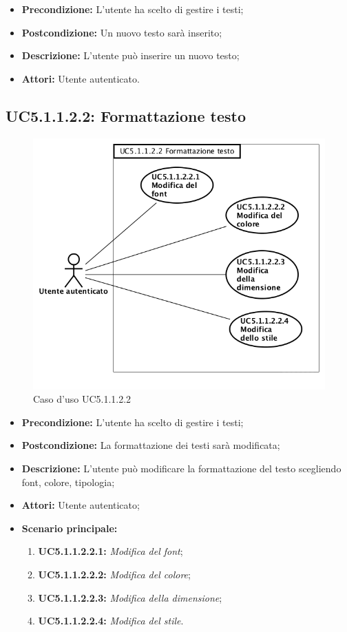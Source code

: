 \begin{itemize}
	\item \textbf{Precondizione:} L'utente ha scelto di gestire i testi;
	\item \textbf{Postcondizione:} Un nuovo testo sarà inserito;
	\item \textbf{Descrizione:} L'utente può inserire un nuovo testo;
	\item \textbf{Attori:} Utente autenticato.
\end{itemize}
\newpage
\subsection{ UC5.1.1.2.2: Formattazione testo}

\begin{figure}[h]
	\begin{center}
	\includegraphics[scale=0.4]{diagram/UC5-1-1-2-2.png}
	\caption{Caso d'uso UC5.1.1.2.2}
	\end{center}
\end{figure}
\begin{itemize}
	\item \textbf{Precondizione:} L'utente ha scelto di gestire i testi;
	\item \textbf{Postcondizione:} La formattazione dei testi sarà modificata;
	\item \textbf{Descrizione:} L'utente può modificare la formattazione del testo scegliendo font, colore, tipologia;
	\item \textbf{Attori:} Utente autenticato;
	\item \textbf{Scenario principale:}
	\begin{enumerate}
		\item \textbf{ UC5.1.1.2.2.1:} \textit{ Modifica del font};
		\item \textbf{ UC5.1.1.2.2.2:} \textit{ Modifica del colore};
		\item \textbf{ UC5.1.1.2.2.3:} \textit{ Modifica della dimensione};
		\item \textbf{ UC5.1.1.2.2.4:} \textit{ Modifica del stile}.
	\end{enumerate}
\end{itemize}
